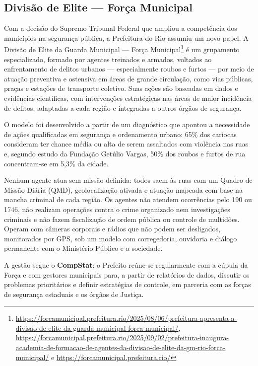 \documentclass[11pt,a4paper]{article}
\begin{document}
\subsection{Divisão de Elite --- Força Municipal}
Com a decisão do Supremo Tribunal Federal que ampliou a competência dos municípios na segurança
pública, a Prefeitura do Rio assumiu um novo papel. A Divisão de Elite da Guarda Municipal --- Força
Municipal\footnote{\url{https://forcamunicipal.prefeitura.rio/2025/08/06/prefeitura-apresenta-a-divisao-de-elite-da-guarda-municipal-forca-municipal/}, \url{https://forcamunicipal.prefeitura.rio/2025/09/02/prefeitura-inaugura-academia-de-formacao-de-agentes-da-divisao-de-elite-da-gm-rio-forca-municipal/} e \url{https://forcamunicipal.prefeitura.rio/}}
é um grupamento especializado, formado por agentes treinados e armados, voltados ao enfrentamento de
delitos urbanos --- especialmente roubos e furtos --- por meio de atuação preventiva e ostensiva em
áreas de grande circulação, como vias públicas, praças e estações de transporte coletivo. Suas ações
são baseadas em dados e evidências científicas, com intervenções estratégicas nas áreas de maior
incidência de delitos, adaptadas a cada região e integradas a outros órgãos de segurança.

O modelo foi desenvolvido a partir de um diagnóstico que apontou a necessidade de ações qualificadas
em segurança e ordenamento urbano: 65\% dos cariocas consideram ter chance média ou alta de serem
assaltados com violência nas ruas e, segundo estudo da Fundação Getúlio Vargas, 50\% dos roubos e
furtos de rua concentram-se em 5,3\% da cidade.

Nenhum agente atua sem missão definida: todos saem às ruas com um Quadro de Missão Diária (QMD),
geolocalização ativada e atuação mapeada com base na mancha criminal de cada região. Os agentes não
atendem ocorrências pelo 190 ou 1746, não realizam operações contra o crime organizado nem
investigações criminais e não fazem fiscalização de ordem pública ou controle de multidões. Operam
com câmeras corporais e rádios que não podem ser desligados, monitorados por GPS, sob um modelo com
corregedoria, ouvidoria e diálogo permanente com o Ministério Público e a sociedade.

A gestão segue o \textbf{CompStat}: o Prefeito reúne-se regularmente com a cúpula da Força e com
gestores municipais para, a partir de relatórios de dados, discutir os problemas prioritários e
definir estratégias de controle, em parceria com as forças de segurança estaduais e os órgãos de
Justiça.
\end{document}
